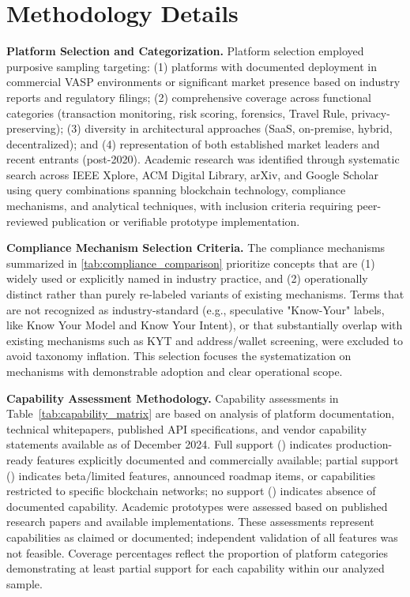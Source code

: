 \appendix

\section*{Methodology Details}
\label{appendix:methodology}

\noindent\textbf{Platform Selection and Categorization.}
Platform selection employed purposive sampling targeting: (1) platforms with documented deployment in commercial VASP environments or significant market presence based on industry reports and regulatory filings; (2) comprehensive coverage across functional categories (transaction monitoring, risk scoring, forensics, Travel Rule, privacy-preserving); (3) diversity in architectural approaches (SaaS, on-premise, hybrid, decentralized); and (4) representation of both established market leaders and recent entrants (post-2020). Academic research was identified through systematic search across IEEE Xplore, ACM Digital Library, arXiv, and Google Scholar using query combinations spanning blockchain technology, compliance mechanisms, and analytical techniques, with inclusion criteria requiring peer-reviewed publication or verifiable prototype implementation.

\noindent\textbf{Compliance Mechanism Selection Criteria.}
The compliance mechanisms summarized in \autoref{tab:compliance_comparison} prioritize concepts that are (1) widely used or explicitly named in industry practice, and (2) operationally distinct rather than purely re-labeled variants of existing mechanisms. Terms that are not recognized as industry-standard (e.g., speculative "Know-Your" labels, like Know Your Model and Know Your Intent), or that substantially overlap with existing mechanisms such as KYT and address/wallet screening, were excluded to avoid taxonomy inflation. This selection focuses the systematization on mechanisms with demonstrable adoption and clear operational scope.

\noindent\textbf{Capability Assessment Methodology.}
Capability assessments in Table~\ref{tab:capability_matrix} are based on analysis of platform documentation, technical whitepapers, published API specifications, and vendor capability statements available as of December 2024. Full support (\fullcirc) indicates production-ready features explicitly documented and commercially available; partial support (\halfcirc) indicates beta/limited features, announced roadmap items, or capabilities restricted to specific blockchain networks; no support (\emptycirc) indicates absence of documented capability. Academic prototypes were assessed based on published research papers and available implementations. These assessments represent capabilities as claimed or documented; independent validation of all features was not feasible. Coverage percentages reflect the proportion of platform categories demonstrating at least partial support for each capability within our analyzed sample.

